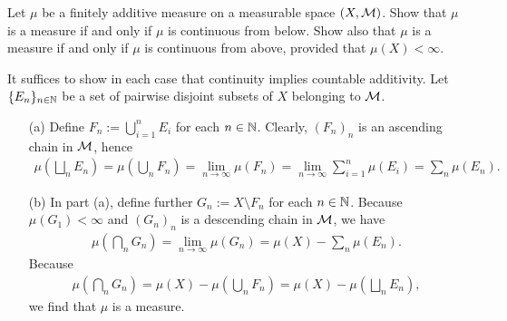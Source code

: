 \begin{prob}[Exercise 1.11]
    Let $\mu$ be a finitely additive measure on a measurable space $(X, {\mathcal{M}})$.
    Show that $\mu$ is a measure if and only if $\mu$ is continuous from below.
    Show also that $\mu$ is a measure if and only if $\mu$ is continuous from above, provided that $\mu(X)<\infty$.
\end{prob}
\begin{sol}
    It suffices to show in each case that continuity implies countable additivity.
    Let $\{E_n\}_{n\in{\mathbb{N}}}$ be a set of pairwise disjoint subsets of $X$ belonging to ${\mathcal{M}}$.
    \begin{enumerate}
        \item[(a)]
        {    
            Define $F_n:=\bigcup_{i=1}^n E_i$ for each $n\in{\mathbb{N}}$.
            Clearly, $(F_n)_n$ is an ascending chain in ${\mathcal{M}}$, hence
            \begin{align*}
                \mu\left(\bigsqcup_n E_n\right)=\mu\left(\bigcup_n F_n\right)=\lim_{n\rightarrow\infty}\mu(F_n)=\lim_{n\rightarrow\infty}\sum_{i=1}^n\mu(E_i)=\sum_n\mu(E_n).
            \end{align*}
        }
        \item[(b)]
        {
            In part (a), define further $G_n:=X\setminus F_n$ for each $n\in{\mathbb{N}}$.
            Because $\mu(G_1)<\infty$ and $(G_n)_n$ is a descending chain in ${\mathcal{M}}$, we have
            \begin{align*}
                \mu\left(\bigcap_n G_n\right)=\lim_{n\rightarrow\infty}\mu(G_n)=\mu(X)-\sum_n\mu(E_n).
            \end{align*}
            Because
            \begin{align*}
                \mu\left(\bigcap_n G_n\right)=\mu(X)-\mu\left(\bigcup_n F_n\right)=\mu(X)-\mu\left(\bigsqcup_n E_n\right),
            \end{align*}
            we find that $\mu$ is a measure.
        }
    \end{enumerate}
\end{sol}

